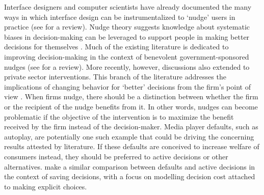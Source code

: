 \documentclass[11pt,a4paper,oneside]{article}
\begin{document}
Interface designers and computer scientists have already documented the many ways in which interface design can be instrumentalized to  `nudge' users in practice (see \citet{caraban201923} for a review). Nudge theory suggests knowledge about systematic biases in decision-making can be leveraged to support people in making better decisions for themselves \citep{thaler2009nudge}. Much of the existing literature is dedicated to improving decision-making in the context of benevolent government-sponsored nudges (see \citet{mertens2022effectiveness} for a review). More recently, however, discussions also extended to private sector interventions. This branch of the literature addresses the implications of changing behavior for `better' decisions from the firm’s point of view \citep{smith2013choice,beggs2016private, mills2023nudge}. When firms nudge, there should be a distinction between whether the firm or the recipient of the nudge benefits from it. In other words, nudges can become problematic if the objective of the intervention is to maximize the benefit received by the firm instead of the decision-maker. Media player defaults, such as autoplay, are potentially one such example that could be driving the concerning results attested by literature. If these defaults are conceived to increase welfare of consumers instead, they should be preferred to active decisions or other alternatives. \citet{carroll2009optimal} make a similar comparison between defaults and active decisions in the context of saving decisions, with a focus on modelling  decision cost attached to making explicit choices.

\end{document}
